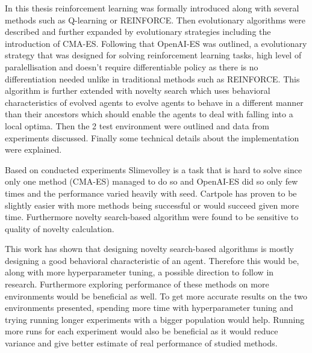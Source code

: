 

In this thesis reinforcement learning was formally introduced along with several methods such as Q-learning or REINFORCE. Then evolutionary algorithms were described and further expanded by evolutionary strategies including the introduction of CMA-ES. Following that OpenAI-ES was outlined, a evolutionary strategy that was designed for solving reinforcement learning tasks, high level of paralellisation and doesn't require differentiable policy as there is no differentiation needed unlike in traditional methods such as REINFORCE. This algorithm is further extended with novelty search which uses behavioral characteristics of evolved agents to evolve agents to behave in a different manner than their ancestors which should enable the agents to deal with falling into a local optima. Then the 2 test environment were outlined and data from experiments discussed. Finally some technical details about the implementation were explained.

Based on conducted experiments Slimevolley is a task that is hard to solve since only one method (CMA-ES) managed to do so and OpenAI-ES did so only few times and the performance varied heavily with seed. Cartpole has proven to be slightly easier with more methods being successful or would succeed given more time. Furthermore novelty search-based algorithm were found to be sensitive to quality of novelty calculation.

This work has shown that designing novelty search-based algorithms is mostly designing a good behavioral characteristic of an agent. Therefore this would be, along with more hyperparameter tuning, a possible direction to follow in research. Furthermore exploring performance of these methods on more environments would be beneficial as well. To get more accurate results on the two environments presented, spending more time with hyperparameter tuning and trying running longer experiments with a bigger population would help. Running more runs for each experiment would also be beneficial as it would reduce variance and give better estimate of real performance of studied methods.



